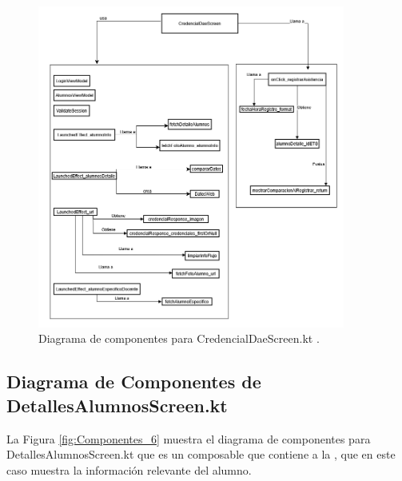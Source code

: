 \begin{figure}[htbp!]
	\begin{center}
		\includegraphics[width=0.9\textwidth]{DiagramasMoviles/DCM (17)}
		\caption{Diagrama de componentes para CredencialDaeScreen.kt .}
		\label{fig:Componentes_5}
	\end{center}
\end{figure}

\newpage

\subsection{Diagrama de Componentes de DetallesAlumnosScreen.kt}

La Figura \ref{fig:Componentes_6} muestra el diagrama de componentes para DetallesAlumnosScreen.kt que es un composable que contiene a la , que en este caso muestra la información relevante del alumno.

